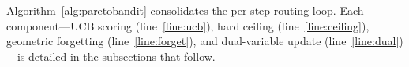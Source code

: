 %
%

Algorithm~\ref{alg:paretobandit} consolidates the per-step routing loop.  Each component---UCB scoring (line~\ref{line:ucb}), hard ceiling (line~\ref{line:ceiling}), geometric forgetting (line~\ref{line:forget}), and dual-variable update (line~\ref{line:dual})---is detailed in the subsections that follow.

